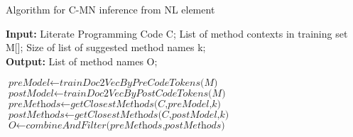 





\begin{algorithm}
    \caption{Algorithm for C-MN inference from NL element}\label{algmNeuralEmbedding}
    \hspace*{\algorithmicindent} \textbf{Input:}
     Literate Programming Code C;
    List of method contexts in training set M[];
    Size of list of suggested method names k;
    \\
    \hspace*{\algorithmicindent} \textbf{Output:} 
    List of method names O;
    \begin{algorithmic}[1]

    \State $\textit{preModel} \gets \textit{trainDoc2VecByPreCodeTokens(M)} $
    \State $\textit{postModel} \gets \textit{trainDoc2VecByPostCodeTokens(M)} $
    \\
    \State $\textit{preMethods} \gets \textit{getClosestMethods(C,preModel,k)} $
    \State $\textit{postMethods} \gets \textit{getClosestMethods(C,postModel,k)} $
    \\
    \State $\textit{O} \gets \textit{combineAndFilter(preMethods,postMethods)} $
    
    \EndProcedure
    \end{algorithmic}
    \end{algorithm}